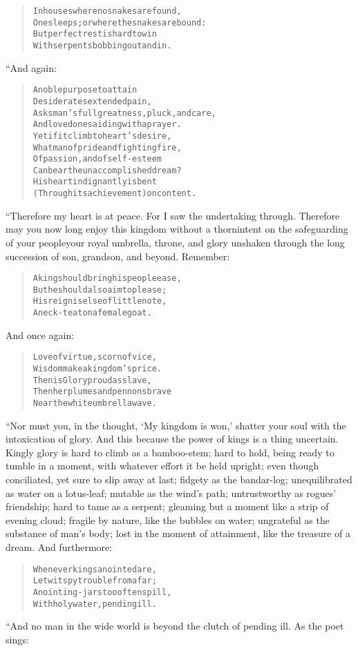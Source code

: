 \documentclass[article, twoside, 14pt]{memoir}
\renewenvironment{verbatim}{%
\begin{quote}%
\vskip -10pt%
\begin{alltt}\normalfont\large}{\end{alltt}%
\end{quote}%
\vskip -10pt
} %
\begin{document}
\begin{verbatim}
In houses where no snakes are found,
One sleeps; or where the snakes are bound:
But perfect rest is hard to win
With serpents bobbing out and in.
\end{verbatim}
“And again:

\begin{verbatim}
A noble purpose to attain
Desiderates extended pain,
Asks man's full greatness, pluck, and care,
And loved ones aiding with a prayer.
Yet if it climb to heart's desire,
What man of pride and fighting fire,
Of passion, and of self-esteem
Can bear the unaccomplished dream?
His heart indignantly is bent
(Through its achievement) on content.
\end{verbatim}
“Therefore my heart is at peace. For I saw the undertaking through.
Therefore may you now long enjoy this kingdom without a
thorn{\textemdash}intent on the safeguarding of your people{\textemdash}your royal
umbrella, throne, and glory unshaken through the long succession of
son, grandson, and beyond. Remember:

\begin{verbatim}
A king should bring his people ease,
But he should also aim to please;
His reign is else of little note,
A neck-teat on a female goat.
\end{verbatim}
And once again:

\begin{verbatim}
Love of virtue, scorn of vice,
Wisdom{\textemdash}make a kingdom's price.
Then is Glory proud as slave,
Then her plumes and pennons brave
Near the white umbrella wave.
\end{verbatim}
“Nor must you, in the thought, `My kingdom is won,' shatter your
soul with the intoxication of glory. And this because the power of
kings is a thing uncertain. Kingly glory is hard to climb as
a bamboo-stem; hard to hold, being ready to tumble in a moment,
with whatever effort it be held upright; even though conciliated,
yet sure to slip away at last; fidgety as the bandar-log;
unequilibrated as water on a lotus-leaf; mutable as the wind's
path; untrustworthy as rogues' friendship; hard to tame as a
serpent; gleaming but a moment like a strip of evening cloud;
fragile by nature, like the bubbles on water; ungrateful as the
substance of man's body; lost in the moment of attainment, like the
treasure of a dream. And furthermore:

\begin{verbatim}
Whenever kings anointed are,
Let wit spy trouble from afar;
Anointing-jars too often spill,
With holy water, pending ill.
\end{verbatim}
“And no man in the wide world is beyond the clutch of pending ill.
As the poet sings:
\end{document}
